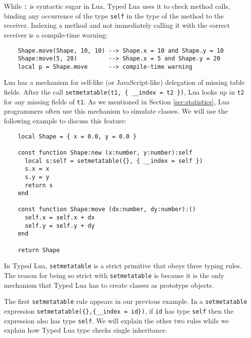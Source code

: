 While \texttt{:} is syntactic sugar in Lua, Typed Lua uses it
to check method calls, binding any occurrence of the type \texttt{self}
in the type of the method to the receiver.
Indexing a method and not immediately calling it with the correct
receiver is a compile-time warning:
\begin{verbatim}
    Shape.move(Shape, 10, 10) --> Shape.x = 10 and Shape.y = 10
    Shape:move(5, 20)         --> Shape.x = 5 and Shape.y = 20
    local p = Shape.move      --> compile-time warning
\end{verbatim}

Lua has a mechanism for self-like (or JavaScript-like) delegation of
missing table fields.
After the call \texttt{setmetatable(t1, \{ \string_\string_index = t2 \})},
Lua looks up in \texttt{t2} for any missing fields of \texttt{t1}.
As we mentioned in Section \ref{sec:statistics},
Lua programmers often use this mechanism to simulate classes.
We will use the following example to discuss this feature:
\begin{verbatim}
    local Shape = { x = 0.0, y = 0.0 }

    const function Shape:new (x:number, y:number):self
      local s:self = setmetatable({}, { __index = self })
      s.x = x
      s.y = y
      return s
    end

    const function Shape:move (dx:number, dy:number):()
      self.x = self.x + dx
      self.y = self.y + dy
    end

    return Shape
\end{verbatim}

In Typed Lua, \texttt{setmetatable} is a strict primitive
that obeys three typing rules.
The reason for being so strict with \texttt{setmetatable} is because
it is the only mechanism that Typed Lua has to create classes
as prototype objects.

The first \texttt{setmetatable} rule appears in our previous example.
In a \texttt{setmetatable} expression
\texttt{setmetatable(\{\},\{\string_\string_index = id\})},
if \texttt{id} has type \texttt{self} then the expression also has type \texttt{self}.
We will explain the other two rules while we explain how
Typed Lua type checks single inheritance.

